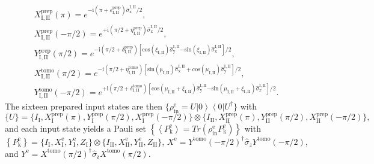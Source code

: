 \[
\begin{array}{c}
X_{\mathrm{I,II}}^{\mathrm{prep}}(\pi)=e^{-\mathrm{i}\left(\pi+\varepsilon_{\mathrm{I,II}}^{\mathrm{prep}}\right)\hat{\sigma}_{\mathrm{x}}^{\mathrm{I,II}}/2},\\
X_{\mathrm{I,II}}^{\mathrm{prep}}(-\pi/2)=e^{+\mathrm{i}\left(\pi/2+\eta_{\mathrm{I,II}}^{\mathrm{prep}}\right)\hat{\sigma}_{\mathrm{x}}^{\mathrm{I,II}}/2},\\
Y_{\mathrm{I,II}}^{\mathrm{prep}}(\pi/2)=e^{-\mathrm{i}\left(\pi/2+\delta_{\mathrm{I,II}}^{\mathrm{prep}}\right)\left[\mathrm{cos}\left(\xi_{\mathrm{I,II}}\right)\hat{\sigma}_{\mathrm{y}}^{\mathrm{I,II}}\mathrm{-sin}\left(\xi_{\mathrm{I,II}}\right)\hat{\sigma}_{\mathrm{x}}^{\mathrm{I,II}}\right]/2},\\
X_{\mathrm{I,II}}^{\mathrm{tomo}}(\pi/2)=e^{-\mathrm{i}\left(\pi/2+\eta_{\mathrm{I,II}}^{\mathrm{tomo}}\right)\left[\mathrm{\mathrm{sin}\left(\mu_{I,II}\right)\hat{\sigma}_{x}^{I,II}+cos}\left(\mu_{\mathrm{I,II}}\right)\hat{\sigma}_{\mathrm{y}}^{\mathrm{I,II}}\right]/2},\\
Y_{\mathrm{I,II}}^{\mathrm{tomo}}(-\pi/2)=e^{+\mathrm{i}\left(\pi/2+\delta_{\mathrm{I,II}}^{\mathrm{tomo}}\right)\left[\mathrm{cos}\left(\mu_{\mathrm{I,II}}+\xi_{\mathrm{I,II}}\right)\hat{\sigma}_{\mathrm{y}}^{\mathrm{I,II}}\mathrm{-sin}\left(\mu_{\mathrm{I,II}}+\xi_{\mathrm{I,II}}\right)\hat{\sigma}_{x}^{\mathrm{I,II}}\right]/2}.\end{array}\]
The sixteen prepared input states are then $\{ \rho_{\mathrm{in}}^{\mathrm{e}}=U\left|0\right\rangle \left\langle 0\right|U^{\dagger}\} $
with 
%
\begin{equation}
\{ U\} =\{I_{\mathrm{I}}, X_{\mathrm{I}}^{\mathrm{prep}}(\pi), Y_{\mathrm{I}}^{\mathrm{prep}}(\pi/2),X_{\mathrm{I}}^{\mathrm{prep}}(-\pi/2)\}\otimes\{I_{\mathrm{II}},X_{\mathrm{II}}^{\mathrm{prep}}(\pi),Y_{\mathrm{II}}^{\mathrm{prep}}(\pi/2),X_{\mathrm{II}}^{\mathrm{prep}}(-\pi/2)\},
\end{equation}
%
and each input state yields a Pauli set $\left\{ \left\langle P_{\mathrm{k}}^{\mathrm{e}}\right\rangle =Tr\left(\rho_{\mathrm{in}}^{\mathrm{e}}P_{\mathrm{k}}^{\mathrm{e}}\right)\right\} $
with $\left\{ P_{\mathrm{k}}^{\mathrm{e}}\right\} =\{I_{\mathrm{I}},X_{\mathrm{I}}^{\mathrm{e}},Y_{\mathrm{I}}^{\mathrm{e}},Z_{\mathrm{I}}\}\otimes\{I_{\mathrm{II}},X_{\mathrm{II}}^{\mathrm{e}},Y_{\mathrm{II}}^{\mathrm{e}},Z_{\mathrm{II}}\}$,
$X^{\mathrm{e}}=Y^{\mathrm{tomo}}(-\pi/2)^{\dagger}\hat{\sigma}_{z}Y^{\mathrm{tomo}}(-\pi/2)$,
and $Y^{\mathrm{e}}=X^{\mathrm{tomo}}(\pi/2)^{\dagger}\hat{\sigma}_{\mathrm{z}}X^{\mathrm{tomo}}(\pi/2)$.

